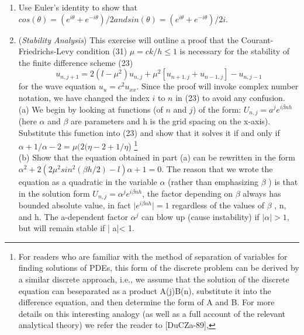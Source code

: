 \documentclass[../main.tex]{subfiles}
\begin{document}
{{\begin{enumerate}
b) Repeat part (a) but change $T(x,t/) = (1/ 4)sin(5t)sin(3x)$. 
\\
\\
NOTE: The next exercise will outline a proof of the necessity of the Courant-Friedrichs-Levy 
condition for the stability of the finite difference method in solving the wave equation. The proof will 
rely on finding exact solutions of the difference equation. As was the case with difference schemes for 
ODE in Part II, the theory of finding a solution of a finite difference scheme for a PDE closely parallels 
the theory of analytical solutions. Since we do not discuss this analytical theory, we will only start with 
a suitable form for a solution of the difference equation without discussing the motivation for this 
choice. The proofs will run more smoothly if we use complex numbers and, in particular, Euler's 
identity: $e^{i\theta} - cos(\theta) + /sin(\theta)$, where $i = \sqrt{-1}$ is the complex unit
	\item
		Use Euler's identity to show that $cos(\theta) = (e^{i\theta}+ e^{-i\theta})/2 and sin(\theta) = (e^{i\theta}+ e^{-i\theta})/2i$. 
		\item
			(\textit{Stability Analysis}) This exercise will outline a proof that the Courant-Friedrichs-Levy 
condition (31) $\mu = ck / h \leqslant 1$ is necessary for the stability of the finite difference scheme (23)
$$u_{n,j+1}=2(l-\mu^2)u_{n,j}+\mu^2[u_{n+1,j}+u_{n-1,j}]-u_{n,j-1}$$
for the wave equation $u_u = c^2u_{xx}$. Since the proof will invoke complex number notation, we have changed the index $i$ to $n$ in (23) to avoid any confusion.
\\ 
(a) We begin by looking at functions (of $n$ and $j$) of the form: $U_{n,j} = a^je^{i\beta n h}$ (here $\alpha$ and $\beta$ are parameters and h is the grid spacing on the x-axis). Substitute this function into (23) and show that it solves it if and only if $\alpha +1 /\alpha-2 = \mu(2(\eta-2 + 1/\eta$) 
\footnote{For readers who are familiar with the method of separation of variables for finding solutions of PDEs, this form of the discrete problem can be derived by a similar discrete approach, i.e., we assume that the solution of the discrete equation can beseparated as a product A(j)B(n), substitute it into the difference equation, and then determine the form of A and B. For more details on this interesting analogy (as well as a full account of the relevant analytical theory) we refer the reader to [DuCZa-89], }
\\(b) Show that the equation obtained in part (a) can be rewritten in the form $\alpha^2 +2(2\mu^2 sin^2(\beta h/2)- l)\alpha + 1 = 0$. The reason that we wrote the equation as a quadratic in the variable $\alpha$ (rather than emphasizing $\beta$ ) is that in the solution form $U_{n,j} = \alpha^j e^{i\beta n h}$, the factor depending on $\beta$ always has bounded absolute value, in fact $\vert e^{i\beta n h} \vert=1$ regardless of the values of $\beta$ , n, and h. The a-dependent factor $\alpha^j$ can blow up (cause instability) if $\vert\alpha \vert > 1$, but will remain stable if | a|< 1.

\end{enumerate}}}
\end{document}
